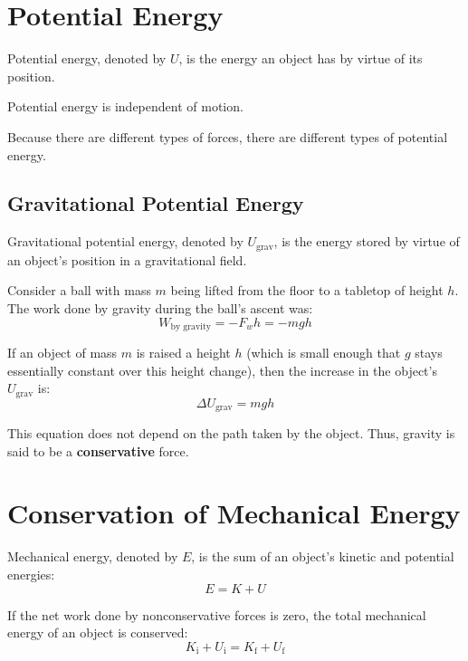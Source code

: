 \documentclass{article}
\begin{document}
\section{Potential Energy}
\begin{definition}
    Potential energy, denoted by $U$, is the energy an object has by virtue of its position.
\end{definition}
\begin{note}
    Potential energy is independent of motion.
\end{note}
Because there are different types of forces, there are different types of potential energy.
\subsection{Gravitational Potential Energy}
\begin{definition}
    Gravitational potential energy, denoted by $U_{\text{grav}}$, is the energy stored by virtue of an object's position in a gravitational field.
\end{definition}
\begin{example}
    Consider a ball with mass $m$ being lifted from the floor to a tabletop of height $h$. The work done by gravity during the ball's ascent was:
    \begin{equation*}
        W_{\text{by gravity}} = -F_{w}h = -mgh
    \end{equation*}
\end{example}
If an object of mass $m$ is raised a height $h$ (which is small enough that $g$ stays essentially constant over this height change), then the increase in the object's $U_{\text{grav}}$ is:
\begin{equation*}
    \Delta U_{\text{grav}} = mgh
\end{equation*}
\begin{note}
    This equation does not depend on the path taken by the object. Thus, gravity is said to be a \textbf{conservative} force.
\end{note}

\section{Conservation of Mechanical Energy}
\begin{definition}
    Mechanical energy, denoted by $E$, is the sum of an object's kinetic and potential energies:
    \begin{equation*}
        E = K + U
    \end{equation*}
\end{definition}
If the net work done by nonconservative forces is zero, the total mechanical energy of an object is conserved:
\begin{equation*}
    K_{\text{i}} + U_{\text{i}} = K_{\text{f}} + U_{\text{f}}
\end{equation*}
\end{document}
